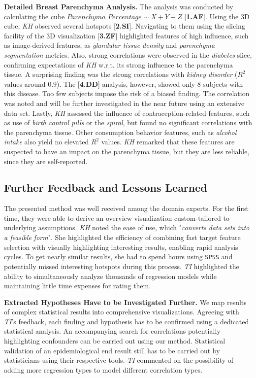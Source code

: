 \documentclass[journal]{style/vgtc} 			          %
\begin{document}
\textbf{Detailed Breast Parenchyma Analysis.}
The analysis was conducted by calculating the cube $Parenchyma\_Percentage \sim X + Y + Z$ [\textbf{1.AF}].
Using the 3D cube, \emph{KH} observed several hotspots [\textbf{2.SI}].
Navigating to them using the slicing facility of the 3D visualization [\textbf{3.ZF}] highlighted features of high influence, such as image-derived features, as \emph{glandular tissue density} and \emph{parenchyma segmentation} metrics.
Also, strong correlations were observed in the \emph{diabetes} slice, confirming expectations of \emph{KH} w.r.t. its strong influence to the parenchyma tissue.
A surprising finding was the strong correlations with \emph{kidney disorder} ($R^2$ values around $0.9$).
The [\textbf{4.DD}] analysis, however, showed only 8 subjects with this disease.
Too few subjects impose the risk of a biased finding.
The correlation was noted and will be further investigated in the near future using an extensive data set.
Lastly, \emph{KH} assessed the influence of contraception-related features, such as use of \emph{birth control pills} or the \emph{spiral}, but found no significant correlations with the parenchyma tissue.
Other consumption behavior features, such as \emph{alcohol intake} also yield no elevated $R^2$ values.
\emph{KH} remarked that these features are suspected to have an impact on the parenchyma tissue, but they are less reliable, since they are self-reported.
\subsection{Further Feedback and Lessons Learned} \label{Lessons Learned}
The presented method was well received among the domain experts.
For the first time, they were able to derive an overview visualization custom-tailored to underlying assumptions.
\emph{KH} noted the ease of use, which "\emph{converts data sets into a feasible form}".
She highlighted the efficiency of combining fast target feature selection with visually highlighting interesting results, enabling rapid analysis cycles.
To get nearly similar results, she had to spend hours using \texttt{SPSS} and potentially missed interesting hotspots during this process.
\emph{TI} highlighted the ability to simultaneously analyze thousands of regression models while maintaining little time expenses for rating them.

\textbf{Extracted Hypotheses Have to be Investigated Further.}
We map results of complex statistical results into comprehensive visualizations.
Agreeing with \emph{TI}'s feedback, each finding and hypothesis has to be confirmed using a dedicated statistical analysis.
An accompanying search for correlations potentially highlighting confounders can be carried out using our method.
Statistical validation of an epidemiological end result still has to be carried out by statisticians using their respective tools.
\emph{TI} commented on the possibility of adding more regression types to model different correlation types.%
\end{document}
